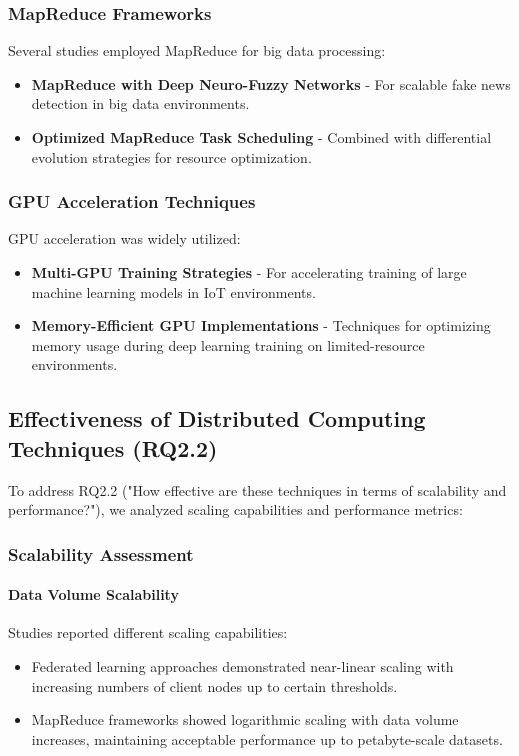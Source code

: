 \subsubsection{MapReduce Frameworks}
Several studies employed MapReduce for big data processing:
\begin{itemize}
    \item \textbf{MapReduce with Deep Neuro-Fuzzy Networks} \citep{Kanchanamala20232414} - For scalable fake news detection in big data environments.
    
    \item \textbf{Optimized MapReduce Task Scheduling} - Combined with differential evolution strategies for resource optimization.
\end{itemize}

\subsubsection{GPU Acceleration Techniques}
GPU acceleration was widely utilized:
\begin{itemize}
    \item \textbf{Multi-GPU Training Strategies} \citep{Wang2022939} - For accelerating training of large machine learning models in IoT environments.
    
    \item \textbf{Memory-Efficient GPU Implementations} - Techniques for optimizing memory usage during deep learning training on limited-resource environments.
\end{itemize}

\subsection{Effectiveness of Distributed Computing Techniques (RQ2.2)}
To address RQ2.2 ("How effective are these techniques in terms of scalability and performance?"), we analyzed scaling capabilities and performance metrics:

\subsubsection{Scalability Assessment}
\paragraph{Data Volume Scalability}
Studies reported different scaling capabilities:
\begin{itemize}
    \item Federated learning approaches demonstrated near-linear scaling with increasing numbers of client nodes up to certain thresholds.
    
    \item MapReduce frameworks showed logarithmic scaling with data volume increases, maintaining acceptable performance up to petabyte-scale datasets.
\end{itemize}

